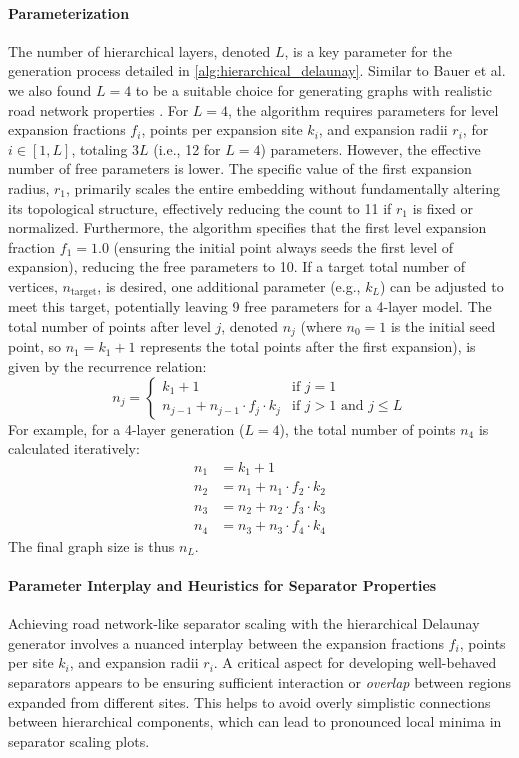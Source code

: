 \paragraph{Parameterization}
The number of hierarchical layers, denoted \(L\), is a key parameter for the generation process detailed in \cref{alg:hierarchical_delaunay}.
Similar to Bauer et al. we also found \(L=4\) to be a suitable choice for generating graphs with realistic road network properties \cite{hutchison_synthetic_2010}.
For \(L=4\), the algorithm requires parameters for level expansion fractions \(f_i\), points per expansion site \(k_i\), and expansion radii \(r_i\), for \(i \in [1, L]\), totaling \(3L\) (i.e., 12 for \(L=4\)) parameters.
However, the effective number of free parameters is lower.
The specific value of the first expansion radius, \(r_1\), primarily scales the entire embedding without fundamentally altering its topological structure, effectively reducing the count to 11 if \(r_1\) is fixed or normalized.
Furthermore, the algorithm specifies that the first level expansion fraction \(f_1 = 1.0\) (ensuring the initial point always seeds the first level of expansion), reducing the free parameters to 10.
If a target total number of vertices, \(n_{\text{target}}\), is desired, one additional parameter (e.g., \(k_L\)) can be adjusted to meet this target, potentially leaving 9 free parameters for a 4-layer model.
The total number of points after level \(j\), denoted \(n_j\) (where \(n_0=1\) is the initial seed point, so \(n_1 = k_1 + 1\) represents the total points after the first expansion), is given by the recurrence relation:
\[
	n_j =
	\begin{cases}
		k_1 + 1                               & \text{if } j=1                        \\
		n_{j-1} + n_{j-1} \cdot f_j \cdot k_j & \text{if } j > 1 \text{ and } j \le L
	\end{cases}
\]
For example, for a 4-layer generation (\(L=4\)), the total number of points \(n_4\) is calculated iteratively:
\begin{align*}
	n_1 & = k_1 + 1                       \\
	n_2 & = n_1 + n_1 \cdot f_2 \cdot k_2 \\
	n_3 & = n_2 + n_2 \cdot f_3 \cdot k_3 \\
	n_4 & = n_3 + n_3 \cdot f_4 \cdot k_4
\end{align*}
The final graph size is thus \(n_L\).

\paragraph{Parameter Interplay and Heuristics for Separator Properties}
Achieving road network-like separator scaling with the hierarchical Delaunay generator involves a nuanced interplay between the expansion fractions \(f_i\), points per site \(k_i\), and expansion radii \(r_i\).
A critical aspect for developing well-behaved separators appears to be ensuring sufficient interaction or \emph{overlap} between regions expanded from different sites.
This helps to avoid overly simplistic connections between hierarchical components, which can lead to pronounced local minima in separator scaling plots.

